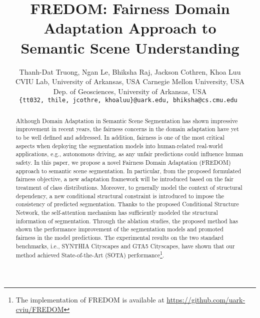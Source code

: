 \documentclass[10pt,twocolumn,letterpaper]{article}
\begin{document}
\title{FREDOM: Fairness Domain Adaptation Approach to \\ Semantic Scene Understanding\vspace{-6mm}}



\author{
Thanh-Dat Truong, Ngan Le, Bhiksha Raj, Jackson Cothren, Khoa Luu\\
CVIU Lab, University of Arkansas, USA \quad
Carnegie Mellon University, USA  \\
Dep. of  Geosciences, University of Arkansas, USA \\
\tt\small \{tt032, thile, jcothre, khoaluu\}@uark.edu, bhiksha@cs.cmu.edu
\vspace{-4mm}
}


\maketitle

\begin{abstract}

Although Domain Adaptation in Semantic Scene Segmentation has shown impressive improvement in recent years, the fairness concerns in the domain adaptation have yet to be well defined and addressed. In addition, fairness is one of the most critical aspects when deploying the segmentation models into human-related real-world applications, e.g., autonomous driving, as any unfair predictions could influence human safety. In this paper, we propose a novel Fairness Domain Adaptation (FREDOM) approach to semantic scene segmentation. In particular, from the proposed formulated fairness objective, a new adaptation framework will be introduced based on the fair treatment of class distributions. Moreover, to generally model the context of structural dependency, a new conditional structural constraint is introduced to impose the consistency of predicted segmentation. Thanks to the proposed Conditional Structure Network, the self-attention mechanism has sufficiently modeled the structural information of segmentation. Through the ablation studies, the proposed method has shown the performance improvement of the segmentation models and promoted fairness in the model predictions. The experimental results on the two standard benchmarks, i.e., SYNTHIA  Cityscapes and GTA5  Cityscapes, have shown that our method achieved State-of-the-Art (SOTA) performance\footnote{The implementation of FREDOM is available at \url{https://github.com/uark-cviu/FREDOM}}.

\end{abstract}
\end{document}
